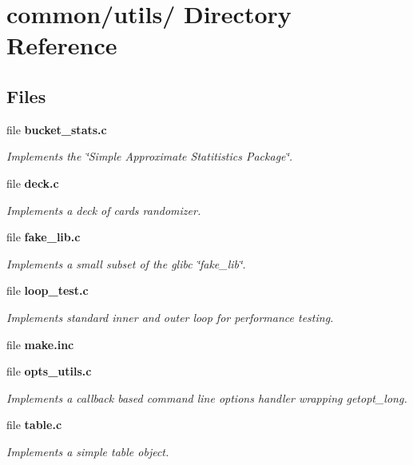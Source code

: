 \section{common/utils/ Directory Reference}
\label{dir_000002}
\subsection*{Files}
\begin{CompactItemize}
\item 
file {\bf bucket\_\-stats.c}
\begin{CompactList}\small\item\em Implements the \char`\"{}Simple Approximate Statitistics Package\char`\"{}. \item\end{CompactList}

\item 
file {\bf deck.c}
\begin{CompactList}\small\item\em Implements a deck of cards randomizer. \item\end{CompactList}

\item 
file {\bf fake\_\-lib.c}
\begin{CompactList}\small\item\em Implements a small subset of the glibc \char`\"{}fake\_\-lib\char`\"{}. \item\end{CompactList}

\item 
file {\bf loop\_\-test.c}
\begin{CompactList}\small\item\em Implements standard inner and outer loop for performance testing. \item\end{CompactList}

\item 
file {\bf make.inc}
\item 
file {\bf opts\_\-utils.c}
\begin{CompactList}\small\item\em Implements a callback based command line options handler wrapping getopt\_\-long. \item\end{CompactList}

\item 
file {\bf table.c}
\begin{CompactList}\small\item\em Implements a simple table object. \item\end{CompactList}


\end{CompactItemize}
